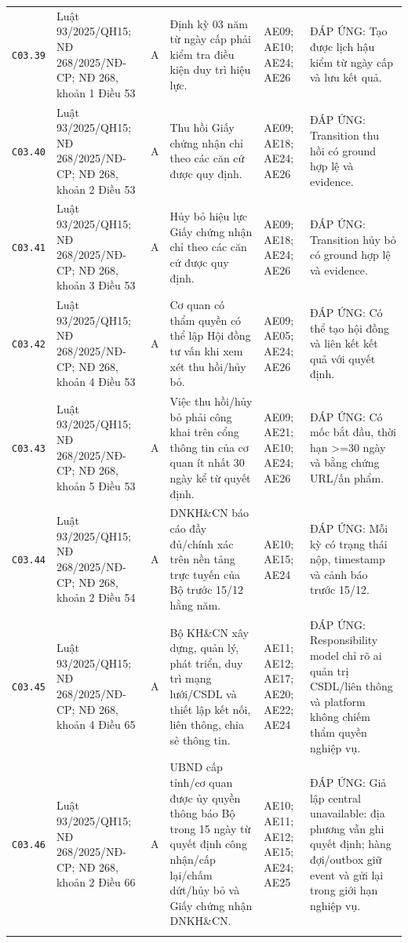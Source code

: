 \begin{longtable}{@{}p{0.9cm}p{3.0cm}p{0.55cm}p{4.05cm}p{2.0cm}p{3.45cm}@{}}
\texttt{C03.39} & Luật 93/2025/QH15; NĐ 268/2025/NĐ-CP; NĐ 268, khoản 1 Điều 53 & A & Định kỳ 03 năm từ ngày cấp phải kiểm tra điều kiện duy trì hiệu lực. & AE09; AE10; AE24; AE26 & ĐÁP ỨNG: Tạo được lịch hậu kiểm từ ngày cấp và lưu kết quả. \\ \addlinespace[1pt]
\texttt{C03.40} & Luật 93/2025/QH15; NĐ 268/2025/NĐ-CP; NĐ 268, khoản 2 Điều 53 & A & Thu hồi Giấy chứng nhận chỉ theo các căn cứ được quy định. & AE09; AE18; AE24; AE26 & ĐÁP ỨNG: Transition thu hồi có ground hợp lệ và evidence. \\ \addlinespace[1pt]
\texttt{C03.41} & Luật 93/2025/QH15; NĐ 268/2025/NĐ-CP; NĐ 268, khoản 3 Điều 53 & A & Hủy bỏ hiệu lực Giấy chứng nhận chỉ theo các căn cứ được quy định. & AE09; AE18; AE24; AE26 & ĐÁP ỨNG: Transition hủy bỏ có ground hợp lệ và evidence. \\ \addlinespace[1pt]
\texttt{C03.42} & Luật 93/2025/QH15; NĐ 268/2025/NĐ-CP; NĐ 268, khoản 4 Điều 53 & A & Cơ quan có thẩm quyền có thể lập Hội đồng tư vấn khi xem xét thu hồi/hủy bỏ. & AE09; AE05; AE24; AE26 & ĐÁP ỨNG: Có thể tạo hội đồng và liên kết kết quả với quyết định. \\ \addlinespace[1pt]
\texttt{C03.43} & Luật 93/2025/QH15; NĐ 268/2025/NĐ-CP; NĐ 268, khoản 5 Điều 53 & A & Việc thu hồi/hủy bỏ phải công khai trên cổng thông tin của cơ quan ít nhất 30 ngày kể từ quyết định. & AE09; AE21; AE10; AE24; AE26 & ĐÁP ỨNG: Có mốc bắt đầu, thời hạn >=30 ngày và bằng chứng URL/ấn phẩm. \\ \addlinespace[1pt]
\texttt{C03.44} & Luật 93/2025/QH15; NĐ 268/2025/NĐ-CP; NĐ 268, khoản 2 Điều 54 & A & DNKH\&CN báo cáo đầy đủ/chính xác trên nền tảng trực tuyến của Bộ trước 15/12 hằng năm. & AE10; AE15; AE24 & ĐÁP ỨNG: Mỗi kỳ có trạng thái nộp, timestamp và cảnh báo trước 15/12. \\ \addlinespace[1pt]
\texttt{C03.45} & Luật 93/2025/QH15; NĐ 268/2025/NĐ-CP; NĐ 268, khoản 4 Điều 65 & A & Bộ KH\&CN xây dựng, quản lý, phát triển, duy trì mạng lưới/CSDL và thiết lập kết nối, liên thông, chia sẻ thông tin. & AE11; AE12; AE17; AE20; AE22; AE24 & ĐÁP ỨNG: Responsibility model chỉ rõ ai quản trị CSDL/liên thông và platform không chiếm thẩm quyền nghiệp vụ. \\ \addlinespace[1pt]
\texttt{C03.46} & Luật 93/2025/QH15; NĐ 268/2025/NĐ-CP; NĐ 268, khoản 2 Điều 66 & A & UBND cấp tỉnh/cơ quan được ủy quyền thông báo Bộ trong 15 ngày từ quyết định công nhận/cấp lại/chấm dứt/hủy bỏ và Giấy chứng nhận DNKH\&CN. & AE10; AE11; AE12; AE15; AE24; AE25 & ĐÁP ỨNG: Giả lập central unavailable: địa phương vẫn ghi quyết định; hàng đợi/outbox giữ event và gửi lại trong giới hạn nghiệp vụ. \\ \addlinespace[1pt]

\end{longtable}
